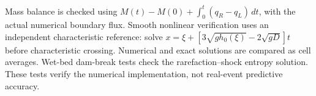 \documentclass[11pt]{article}
\begin{document}
Mass balance is checked using $M(t)-M(0)+\int_0^t(q_R-q_L)\,dt$, with the actual numerical boundary flux. Smooth nonlinear verification uses an independent characteristic reference: solve $x=\xi+[3\sqrt{gh_0(\xi)}-2\sqrt{gD}]t$ before characteristic crossing. Numerical and exact solutions are compared as cell averages. Wet-bed dam-break tests check the rarefaction--shock entropy solution. These tests verify the numerical implementation, not real-event predictive accuracy.



\end{document}
